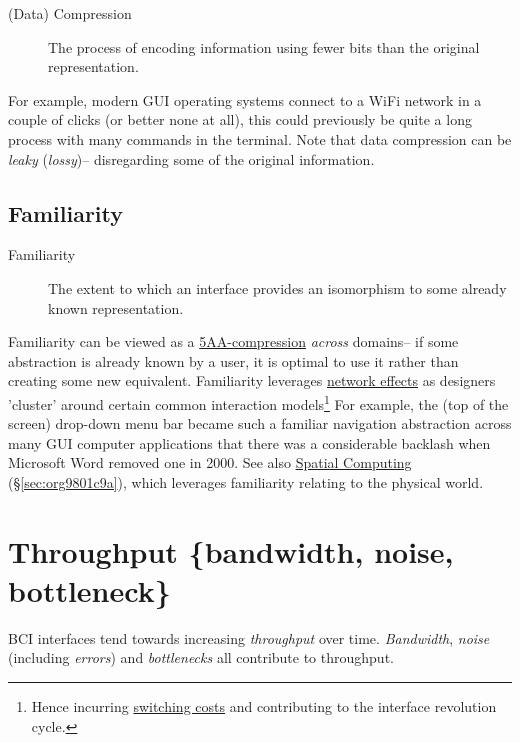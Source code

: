 \documentclass[logo,bsc,singlespacing,parskip]{infthesis}
\begin{document}
\begin{mdframed}
\begin{description}
\item[{(Data) Compression\label{compression}}] The process of encoding information using fewer bits than the original representation.
\end{description}
\end{mdframed}

For example, modern GUI operating systems connect to a WiFi network in a couple of clicks (or better none at all), this could previously be quite a long process with many commands in the terminal.
Note that data compression can be \emph{leaky} (\emph{lossy})-- disregarding some of the original information.

\subsection{Familiarity}
\label{sec:org8e50c21}
\medskip
\begin{mdframed}
\begin{description}
\item[{Familiarity\label{familiarity}}] The extent to which an interface provides an isomorphism to some already known representation.
\end{description}
\end{mdframed}

Familiarity can be viewed as a \hyperref[compression]{5AA-compression} \emph{across} domains-- if some abstraction is already known by a user, it is optimal to use it rather than creating some new equivalent.
Familiarity leverages \hyperref[network effects]{network effects} as designers 'cluster' around certain common interaction models\footnote{Hence incurring \hyperref[switching costs]{switching costs} and contributing to the interface revolution cycle.}
For example, the (top of the screen) drop-down menu bar became such a familiar navigation abstraction across many GUI computer applications that there was a considerable backlash when Microsoft Word removed one in 2000.
See also \hyperref[sec:org9801c9a]{Spatial Computing} (\S \ref{sec:org9801c9a}), which leverages familiarity relating to the physical world.

\section{Throughput \{bandwidth, noise, bottleneck\}}
\label{sec:orgf7efab3}
BCI interfaces tend towards increasing \emph{throughput} over time. \emph{Bandwidth}, \emph{noise} (including \emph{errors}) and \emph{bottlenecks} all contribute to throughput.
\end{document}
